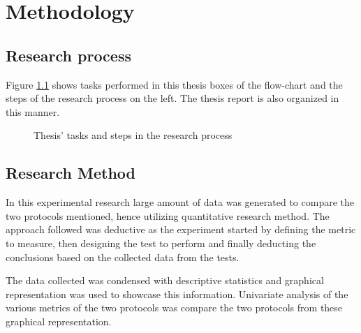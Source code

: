\chapter{Methodology}

\section{Research process}

Figure \ref{RePrSteps} shows tasks performed in this thesis boxes of the flow-chart and the steps of the research process on the left. The thesis report is also organized in this manner.

\begin{figure}[h]
\centering
\def\svgwidth{0.93\columnwidth}

\vspace{-10pt}
\caption{Thesis' tasks and steps in the research process}
\label{RePrSteps}
\end{figure}

\section{Research Method}

In this experimental research large amount of data was generated to compare the two protocols mentioned, hence utilizing quantitative research method. The approach followed was deductive as the experiment started by defining the metric to measure, then designing the test to perform and finally deducting the conclusions based on the collected data from the tests.

The data collected was condensed with descriptive statistics and graphical representation was used to showcase this information. Univariate analysis  of the various metrics of the two protocols was compare the two protocols from these graphical representation.